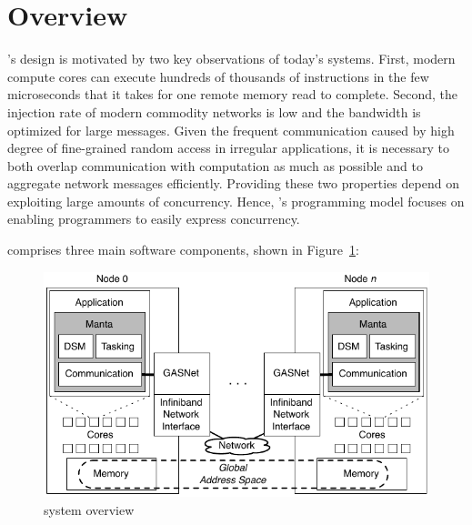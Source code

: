 \section{\Grappa Overview}


\Grappa's design is motivated by two key observations of today's systems.
First, modern compute cores can execute hundreds of thousands of instructions
in the few microseconds that it takes for one remote memory read to complete. Second,
the injection rate of modern commodity networks is low and the bandwidth is
optimized for large messages. Given the frequent communication caused by high
degree of fine-grained random access in irregular applications, it is
necessary to both overlap communication with computation as much as possible
and to aggregate network messages efficiently. Providing these two properties
depend on exploiting large amounts of concurrency. Hence, \Grappa's
programming model focuses on enabling programmers to easily express
concurrency.


\Grappa comprises three main software components, shown in Figure~\ref{fig:grappa}:

\begin{figure}[t]
\begin{center}
  \includegraphics[width=0.95\columnwidth]{figs/system-overview}
\begin{minipage}{0.95\columnwidth}
  \caption{\label{fig:grappa} \Grappa system overview}
\end{minipage}
\vspace{-3ex}
\end{center}
\end{figure}

